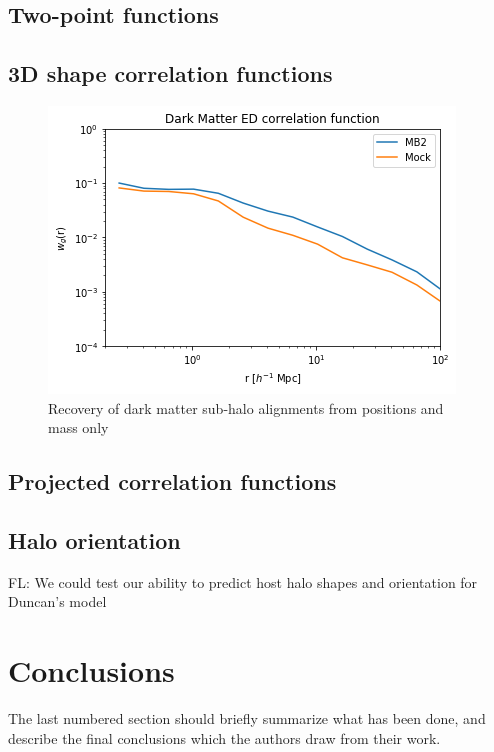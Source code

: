 \documentclass[a4paper,fleqn,usenatbib]{mnras}
\newcommand{\fl}[1]{{\color{magenta}FL: #1}}
\begin{document}
\subsection{Two-point functions}

	\subsection{3D shape correlation functions}

    \begin{figure}
        \centering
        \includegraphics[width=\columnwidth]{Figures/ED_DM}
        \caption{Recovery of dark matter sub-halo alignments from positions and mass only}
        \label{fig:my_label}
    \end{figure}

	\subsection{Projected correlation functions}

\subsection{Halo orientation}

\fl{We could test our ability to predict host halo shapes and orientation for Duncan's model}

\section{Conclusions}


The last numbered section should briefly summarize what has been done, and describe
the final conclusions which the authors draw from their work.
\end{document}
